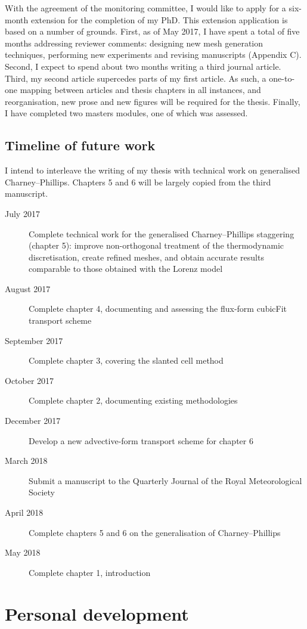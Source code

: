 \documentclass[a4paper,11pt]{article}
\begin{document}
With the agreement of the monitoring committee, I would like to apply for a six-month extension for the completion of my PhD.  This extension application is based on a number of grounds.
First, as of May 2017, I have spent a total of five months addressing reviewer comments: designing new mesh generation techniques, performing new experiments and revising manuscripts (Appendix C).
Second, I expect to spend about two months writing a third journal article.
Third, my second article supercedes parts of my first article.  As such, a one-to-one mapping between articles and thesis chapters in all instances, and reorganisation, new prose and new figures will be required for the thesis.
Finally, I have completed two masters modules, one of which was assessed.

\subsection*{Timeline of future work}

I intend to interleave the writing of my thesis with technical work on generalised Charney--Phillips.  Chapters 5 and 6 will be largely copied from the third manuscript.

\begin{description}
	\item[July 2017]{Complete technical work for the generalised Charney--Phillips staggering (chapter 5): improve non-orthogonal treatment of the thermodynamic discretisation, create refined meshes, and obtain accurate results comparable to those obtained with the Lorenz model}
	\item[August 2017]{Complete chapter 4, documenting and assessing the flux-form cubicFit transport scheme}
	\item[September 2017]{Complete chapter 3, covering the slanted cell method}
	\item[October 2017]{Complete chapter 2, documenting existing methodologies}
	\item[December 2017]{Develop a new advective-form transport scheme for chapter 6}
	\item[March 2018]{Submit a manuscript to the Quarterly Journal of the Royal Meteorological Society}
	\item[April 2018]{Complete chapters 5 and 6 on the generalisation of Charney--Phillips}
	\item[May 2018]{Complete chapter 1, introduction}
\end{description}


\section{Personal development}
\end{document}
